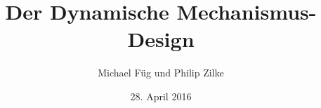 \documentclass{beamer}
\title{Der Dynamische Mechanismus-Design}
\author{Michael F\"ug und Philip Zilke}
\date{28. April 2016}
\begin{document}
\maketitle

\frame{\tableofcontents}




\end{document}
